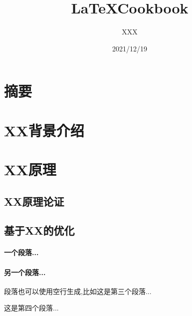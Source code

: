 \documentclass[a4paper,utf8,12pt]{ctexart}
\title{\LaTeX Cookbook} %
\author{XXX} %
\date{2021/12/19} %
\begin{document}
\section*{摘要} %

\section{XX背景介绍} %

\section{XX原理} %
\subsection{XX原理论证} %
\subsection{基于XX的优化} %
\paragraph{一个段落...}

\paragraph{另一个段落...}

段落也可以使用空行生成,比如这是第三个段落...

这是第四个段落...
\end{document}
